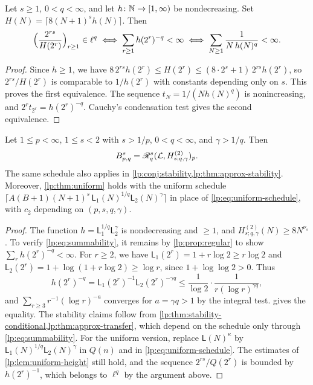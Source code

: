\documentclass[11pt,a4paper]{article}
\begin{document}
\begin{proposicao}
\label{lp:prop:regular}
Let $s\ge1$, $0<q<\infty$, and let $h\colon\mathbb N\to[1,\infty)$ be nondecreasing. Set $H(N)=\lceil8(N+1)^{s}h(N)\rceil$. Then
\[
 \Bigl(\frac{2^{rs}}{H(2^r)}\Bigr)_{r\ge1}\in\ell^q
 \iff\sum_{r\ge1}h(2^r)^{-q}<\infty
 \iff\sum_{N\ge1}\frac1{N\,h(N)^q}<\infty .
\]
\end{proposicao}

\begin{proof}
Since $h\ge1$, we have $8\,2^{rs}h(2^r)\le H(2^r)\le(8\cdot2^s+1)\,2^{rs}h(2^r)$, so $2^{rs}/H(2^r)$ is comparable to $1/h(2^r)$ with constants depending only on $s$. This proves the first equivalence. The sequence $t_N=1/(Nh(N)^q)$ is nonincreasing, and $2^rt_{2^r}=h(2^r)^{-q}$. Cauchy's condensation test gives the second equivalence.
\end{proof}

\begin{corolario}
\label{lp:cor:loglog}
Let $1\le p<\infty$, $1\le s<2$ with $s>1/p$, $0<q<\infty$, and $\gamma>1/q$. Then
\[
 B^{s}_{p,q}=\mathscr R^{s}_{q}(\mathcal L,H^{(2)}_{s;q,\gamma})_p .
\]
The same schedule also applies in \cref{lp:conj:stability,lp:thm:approx-stability}. Moreover, \cref{lp:thm:uniform} holds with the uniform schedule $\lceil A(B+1)(N+1)^s\,\mathsf L_1(N)^{1/q}\mathsf L_2(N)^{\gamma}\rceil$ in place of \eqref{lp:eq:uniform-schedule}, with $c_2$ depending on $(p,s,q,\gamma)$.
\end{corolario}

\begin{proof}
The function $h=\mathsf L_1^{1/q}\mathsf L_2^{\gamma}$ is nondecreasing and $\ge1$, and $H^{(2)}_{s;q,\gamma}(N)\ge8N^{\nu_s}$. To verify \eqref{lp:eq:summability}, it remains by \cref{lp:prop:regular} to show $\sum_rh(2^r)^{-q}<\infty$. For $r\ge2$, we have $\mathsf L_1(2^r)=1+r\log2\ge r\log2$ and $\mathsf L_2(2^r)=1+\log(1+r\log2)\ge\log r$, since $1+\log\log2>0$. Thus
\[
 h(2^r)^{-q}=\mathsf L_1(2^r)^{-1}\mathsf L_2(2^r)^{-\gamma q}\le\frac1{\log2}\cdot\frac1{r(\log r)^{\gamma q}},
\]
and $\sum_{r\ge3}r^{-1}(\log r)^{-a}$ converges for $a=\gamma q>1$ by the integral test.  gives the equality. The stability claims follow from \cref{lp:thm:stability-conditional,lp:thm:approx-transfer}, which depend on the schedule only through \eqref{lp:eq:summability}. For the uniform version, replace $\mathsf L(N)^\kappa$ by $\mathsf L_1(N)^{1/q}\mathsf L_2(N)^{\gamma}$ in $Q(n)$ and in \eqref{lp:eq:uniform-schedule}. The estimates of \cref{lp:lem:uniform-height} still hold, and the sequence $2^{rs}/Q(2^r)$ is bounded by $h(2^r)^{-1}$, which belongs to $\ell^q$ by the argument above.
\end{proof}
\end{document}
